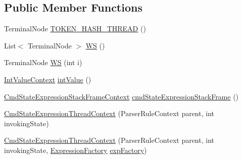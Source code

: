 \subsection*{Public Member Functions}
\begin{DoxyCompactItemize}
\item 
Terminal\+Node \hyperlink{classgov_1_1nasa_1_1jpf_1_1inspector_1_1server_1_1expression_1_1parser_1_1_expression_grammar_paf34f6c6cf6d3cef851c12971caa03ed5_a8e4113b5cf82678ed631cd0d152f85e8}{T\+O\+K\+E\+N\+\_\+\+H\+A\+S\+H\+\_\+\+T\+H\+R\+E\+AD} ()
\item 
List$<$ Terminal\+Node $>$ \hyperlink{classgov_1_1nasa_1_1jpf_1_1inspector_1_1server_1_1expression_1_1parser_1_1_expression_grammar_paf34f6c6cf6d3cef851c12971caa03ed5_ae20bffa33a0f095bcc47ef844ef645a8}{WS} ()
\item 
Terminal\+Node \hyperlink{classgov_1_1nasa_1_1jpf_1_1inspector_1_1server_1_1expression_1_1parser_1_1_expression_grammar_paf34f6c6cf6d3cef851c12971caa03ed5_a33a138517ee3efbce6ab41c595247094}{WS} (int i)
\item 
\hyperlink{classgov_1_1nasa_1_1jpf_1_1inspector_1_1server_1_1expression_1_1parser_1_1_expression_grammar_parser_1_1_int_value_context}{Int\+Value\+Context} \hyperlink{classgov_1_1nasa_1_1jpf_1_1inspector_1_1server_1_1expression_1_1parser_1_1_expression_grammar_paf34f6c6cf6d3cef851c12971caa03ed5_a8fc4759fe4f4729ef1bbcc131a524be3}{int\+Value} ()
\item 
\hyperlink{classgov_1_1nasa_1_1jpf_1_1inspector_1_1server_1_1expression_1_1parser_1_1_expression_grammar_pa1661807291671005dea18d81e1943036}{Cmd\+State\+Expression\+Stack\+Frame\+Context} \hyperlink{classgov_1_1nasa_1_1jpf_1_1inspector_1_1server_1_1expression_1_1parser_1_1_expression_grammar_paf34f6c6cf6d3cef851c12971caa03ed5_aaf2f3a1c5d80f7d13ffc086c739de733}{cmd\+State\+Expression\+Stack\+Frame} ()
\item 
\hyperlink{classgov_1_1nasa_1_1jpf_1_1inspector_1_1server_1_1expression_1_1parser_1_1_expression_grammar_paf34f6c6cf6d3cef851c12971caa03ed5_a3767dc34798904a5fce1680211091f5a}{Cmd\+State\+Expression\+Thread\+Context} (Parser\+Rule\+Context parent, int invoking\+State)
\item 
\hyperlink{classgov_1_1nasa_1_1jpf_1_1inspector_1_1server_1_1expression_1_1parser_1_1_expression_grammar_paf34f6c6cf6d3cef851c12971caa03ed5_ae9c924e45b90d6af0dee3433037c32f0}{Cmd\+State\+Expression\+Thread\+Context} (Parser\+Rule\+Context parent, int invoking\+State, \hyperlink{classgov_1_1nasa_1_1jpf_1_1inspector_1_1server_1_1expression_1_1_expression_factory}{Expression\+Factory} \hyperlink{classgov_1_1nasa_1_1jpf_1_1inspector_1_1server_1_1expression_1_1parser_1_1_expression_grammar_paf34f6c6cf6d3cef851c12971caa03ed5_a471c892c9b81e7d3abf159c0cae4dccc}{exp\+Factory})

\end{DoxyCompactItemize}
